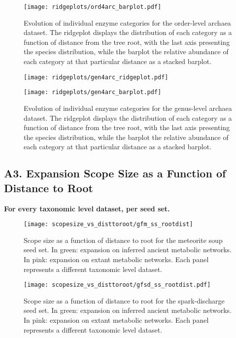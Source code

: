 \begin{figure}[H]
    \centering
    \texttt{[image: ridgeplots/ord4arc\_barplot.pdf]}
    \caption[]{Evolution of individual enzyme categories for the order-level archaea dataset. The ridgeplot displays the distribution of each category as a function of distance from the tree root, with the last axis presenting the species distribution, while the barplot the relative abundance of each category at that particular distance as a stacked barplot.}
    \label{barplot_ord4arc}
\end{figure}

\begin{figure}[H]
    \centering
    \texttt{[image: ridgeplots/gen4arc\_ridgeplot.pdf]}
    \label{ridgeplot_gen4arc}
\end{figure}

\begin{figure}[H]
    \centering
    \texttt{[image: ridgeplots/gen4arc\_barplot.pdf]}
    \caption[]{Evolution of individual enzyme categories for the genus-level archaea dataset. The ridgeplot displays the distribution of each category as a function of distance from the tree root, with the last axis presenting the species distribution, while the barplot the relative abundance of each category at that particular distance as a stacked barplot.}
    \label{barplot_gen4arc}
\end{figure}


\newpage
\subsection*{A3. Expansion Scope Size as a Function of Distance to Root}
\textbf{For every taxonomic level dataset, per seed set.}

\begin{figure}[H]
    \centering
    \texttt{[image: scopesize\_vs\_disttoroot/gfm\_ss\_rootdist]}
    \caption{Scope size as a function of distance to root for the meteorite soup seed set. In green: expansion on inferred ancient metabolic networks. In pink: expansion on extant metabolic networks. Each panel represents a different taxonomic level dataset.}
    \label{gfm_scopesize}
\end{figure}   

\begin{figure}[H]
    \centering
    \texttt{[image: scopesize\_vs\_disttoroot/gfsd\_ss\_rootdist.pdf]}
    \caption{Scope size as a function of distance to root for the spark-discharge seed set. In green: expansion on inferred ancient metabolic networks. In pink: expansion on extant metabolic networks. Each panel represents a different taxonomic level dataset.}
    \label{gfsd_scopesize}
\end{figure}   


